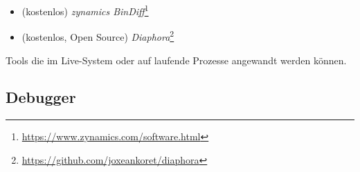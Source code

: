 \begin{itemize}
\item (kostenlos) \emph{zynamics BinDiff}\footnote{\url{https://www.zynamics.com/software.html}}

\item (kostenlos, Open Source) \emph{Diaphora}\footnote{\url{https://github.com/joxeankoret/diaphora}}
\end{itemize}


Tools die im Live-System oder auf laufende Prozesse angewandt werden können.

\subsection{Debugger}

\myindex{\olly}

